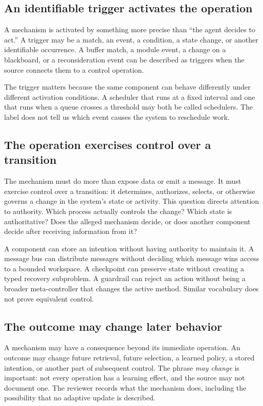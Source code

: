 \subsection{An identifiable trigger activates the operation}

A mechanism is activated by something more precise than ``the agent decides to act.'' A trigger may be a match, an event, a condition, a state change, or another identifiable occurrence. A buffer match, a module event, a change on a blackboard, or a reconsideration event can be described as triggers when the source connects them to a control operation.

The trigger matters because the same component can behave differently under different activation conditions. A scheduler that runs at a fixed interval and one that runs when a queue crosses a threshold may both be called schedulers. The label does not tell us which event causes the system to reschedule work.

\subsection{The operation exercises control over a transition}

The mechanism must do more than expose data or emit a message. It must exercise control over a transition: it determines, authorizes, selects, or otherwise governs a change in the system's state or activity. This question directs attention to authority. Which process actually controls the change? Which state is authoritative? Does the alleged mechanism decide, or does another component decide after receiving information from it?

A component can store an intention without having authority to maintain it. A message bus can distribute messages without deciding which message wins access to a bounded workspace. A checkpoint can preserve state without creating a typed recovery subproblem. A guardrail can reject an action without being a broader meta-controller that changes the active method. Similar vocabulary does not prove equivalent control.

\subsection{The outcome may change later behavior}

A mechanism may have a consequence beyond its immediate operation. An outcome may change future retrieval, future selection, a learned policy, a stored intention, or another part of subsequent control. The phrase \emph{may change} is important: not every operation has a learning effect, and the source may not document one. The reviewer records what the mechanism does, including the possibility that no adaptive update is described.

